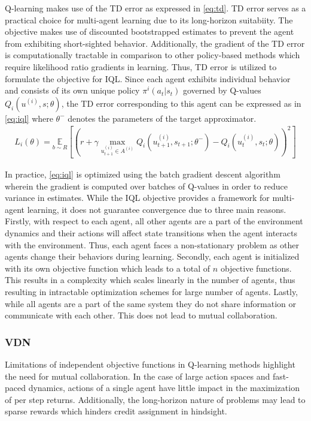 \documentclass{article}
\begin{document}
\begin{multicols}{2}
Q-learning makes use of the TD error as expressed in \autoref{eq:td}. TD error serves as a practical choice for multi-agent learning due to its long-horizon suitabiity. The objective makes use of discounted bootstrapped estimates to prevent the agent from exhibiting short-sighted behavior. Additionally, the gradient of the TD error is computationally tractable in comparison to other policy-based methods \cite{rl} which require likelihood ratio gradients in learning. Thus, TD error is utilized to formulate the objective for IQL. Since each agent exhibits individual behavior and consists of its own unique policy $\pi^{i}(a_{t}|s_{t})$ governed by Q-values $Q_{i}(u^{(i)},s;\theta)$, the TD error corresponding to this agent can be expressed as in \autoref{eq:iql} where $\theta^{-}$ denotes the parameters of the target approximator. 
\begin{gather}
  L_{i}(\theta) = \underset{b \sim R}{\mathbb{E}}[(r + \gamma \underset{u^{(i)}_{t+1}\in A^{(i)}}{\max} Q_{i}(u^{(i)}_{t+1},s_{t+1};\theta^{-}) - Q_{i}(u_{t}^{(i)},s_{t};\theta))^{2}] \label{eq:iql}
\end{gather}

In practice, \autoref{eq:iql} is optimized using the batch gradient descent algorithm wherein the gradient is computed over batches of Q-values in order to reduce variance in estimates. While the IQL objective provides a framework for multi-agent learning, it does not guarantee convergence due to three main reasons. Firstly, with respect to each agent, all other agents are a part of the environment dynamics and their actions will affect state transitions when the agent interacts with the environment. Thus, each agent faces a non-stationary problem as other agents change their behaviors during learning. Secondly, each agent is initialized with its own objective function which leads to a total of $n$ objective functions. This results in a complexity which scales linearly in the number of agents, thus resulting in intractable optimization schemes for large number of agents. Lastly, while all agents are a part of the same system they do not share information or communicate with each other. This does not lead to mutual collaboration. 

\subsubsection{VDN}
Limitations of independent objective functions in Q-learning methods highlight the need for mutual collaboration. In the case of large action spaces \cite{hdqn} and fast-paced dynamics, actions of a single agent have little impact in the maximization of per step returns. Additionally, the long-horizon nature \cite{hdqn} of problems may lead to sparse rewards which hinders credit assignment in hindsight. 


\end{multicols}
\end{document}
